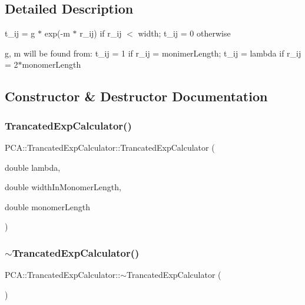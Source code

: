 \subsection{Detailed Description}
t\+\_\+ij = g $\ast$ exp(-\/m $\ast$ r\+\_\+ij) if r\+\_\+ij $<$ width; t\+\_\+ij = 0 otherwise 

g, m will be found from\+: t\+\_\+ij = 1 if r\+\_\+ij = monimer\+Length; t\+\_\+ij = lambda if r\+\_\+ij = 2$\ast$monomer\+Length 

\subsection{Constructor \& Destructor Documentation}
\hypertarget{class_p_c_a_1_1_trancated_exp_calculator_a634a2c2d9bc7f54bacf6531f6f8f2c3c}{}\label{class_p_c_a_1_1_trancated_exp_calculator_a634a2c2d9bc7f54bacf6531f6f8f2c3c} 
\subsubsection{\texorpdfstring{Trancated\+Exp\+Calculator()}{TrancatedExpCalculator()}}
{\footnotesize\ttfamily P\+C\+A\+::\+Trancated\+Exp\+Calculator\+::\+Trancated\+Exp\+Calculator (\begin{DoxyParamCaption}\item[{double}]{lambda,  }\item[{double}]{width\+In\+Monomer\+Length,  }\item[{double}]{monomer\+Length }\end{DoxyParamCaption})}

\hypertarget{class_p_c_a_1_1_trancated_exp_calculator_a029cab04f65d1a4adebb1dbdf8fd4d3d}{}\label{class_p_c_a_1_1_trancated_exp_calculator_a029cab04f65d1a4adebb1dbdf8fd4d3d} 
\subsubsection{\texorpdfstring{$\sim$\+Trancated\+Exp\+Calculator()}{~TrancatedExpCalculator()}}
{\footnotesize\ttfamily P\+C\+A\+::\+Trancated\+Exp\+Calculator\+::$\sim$\+Trancated\+Exp\+Calculator (\begin{DoxyParamCaption}{ }\end{DoxyParamCaption})}



